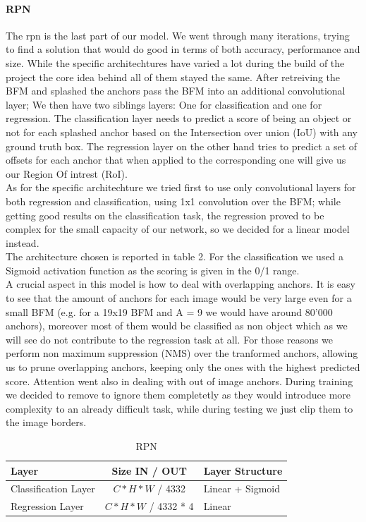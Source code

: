 \documentclass[10pt,journal,cspaper,compsoc]{IEEEtran}
\begin{document}
  \paragraph{RPN}
   The rpn is the last part of our model. We went through many iterations, trying to find a solution that would do good in terms of both accuracy, performance and size. While the specific architechtures have varied a lot during the build of the project the core idea behind all of them stayed the same. After retreiving the  BFM and splashed the anchors pass the BFM into an additional               convolutional layer; We then have two siblings layers: One for classification and one for regression. The classification layer needs to predict a score of being an object or not for each splashed anchor based on the Intersection over union (IoU) with any ground truth box. The regression layer on the other hand tries to predict a set of offsets for each anchor that when applied to the corresponding one will give us our Region Of intrest (RoI).\\ As for the specific architechture we tried first to use only convolutional layers for both regression and classification, using 1x1 convolution over the BFM; while getting good results on the classification task, the regression proved to be complex for the small capacity of our network, so we decided for a linear model instead. \\
The architecture chosen is reported in table 2. For the classification we used a Sigmoid activation function as the scoring is given  in the 0/1 range. \\ A crucial aspect in this model is how to deal with overlapping anchors. It is easy to see that the amount of anchors for each image would be very large even for a small BFM (e.g. for a 19x19 BFM and A = 9 we would have around 80'000 anchors), moreover most of them would be classified as non object which as we will see do not contribute to the regression task at all. For those reasons we perform non maximum suppression (NMS) over the tranformed anchors, allowing us to prune overlapping anchors, keeping only the ones with the highest predicted score. Attention went also in dealing with out of image anchors. During training we decided to remove to ignore them completetly as they would introduce more complexity to an already difficult task, while during testing we just clip them to the image borders.

        \begin{table}[htb]
	\begin{center}
		\caption{RPN}
		\label{tab:Table 2}
		\begin{tabular}{l | c |  l}  
			\textbf{Layer} & \textbf{Size IN / OUT} & \textbf{Layer Structure}\\
			\hline 
			Classification Layer &  $ C * H * W$ / 4332        & Linear + Sigmoid \\ 
			Regression Layer    &  $ C * H * W$ / 4332 * 4  & Linear \\
		\end{tabular}
	\end{center}
     \end{table}
\end{document}
